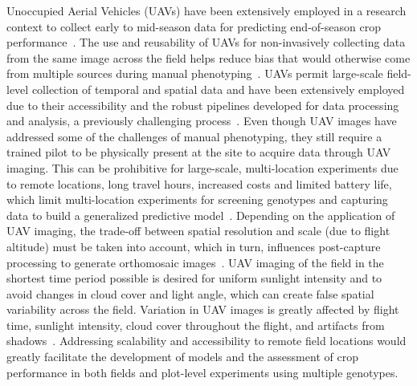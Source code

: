 \documentclass[12pt,twoside]{gsag3jnl}
\begin{document}






Unoccupied Aerial Vehicles (UAVs) have been extensively employed in a research context to collect early to mid-season data for predicting end-of-season crop performance~\citep{guo2021uas}. The use and reusability of UAVs for non-invasively collecting data from the same image across the field helps reduce bias that would otherwise come from multiple sources during manual phenotyping~\citep{themistocleous2014damage}. UAVs permit large-scale field-level collection of temporal and spatial data and have been extensively employed due to their accessibility and the robust pipelines developed for data processing and analysis, a previously challenging process~\citep{araus2018breeding}. Even though UAV images have addressed some of the challenges of manual phenotyping, they still require a trained pilot to be physically present at the site to acquire data through UAV imaging. This can be prohibitive for large-scale, multi-location experiments due to remote locations, long travel hours, increased costs and limited battery life, which limit multi-location experiments for screening genotypes and capturing data to build a generalized predictive model~\citep{kakooei2017fusion}. Depending on the application of UAV imaging, the trade-off between spatial resolution and scale (due to flight altitude) must be taken into account, which in turn, influences post-capture processing to generate orthomosaic images~\citep{pathak2020use}. UAV imaging of the field in the shortest time period possible is desired for uniform sunlight intensity and to avoid changes in cloud cover and light angle, which can create false spatial variability across the field. Variation in UAV images is greatly affected by flight time, sunlight intensity, cloud cover throughout the flight, and artifacts from shadows~\citep{oliveira2018failure, adak2023pedigree}. Addressing scalability and accessibility to remote field locations would greatly facilitate the development of models and the assessment of crop performance in both fields and plot-level experiments using multiple genotypes.
\end{document}
